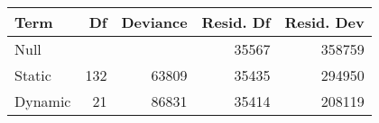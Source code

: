 
\begin{tabular}{lrrrr}
    \toprule
    \textbf{Term}
        & \textbf{Df}
        & \textbf{Deviance}
        & \textbf{Resid. Df}
        & \textbf{Resid. Dev} \\
    \midrule
    Null &  &  & 35567 & 358759 \\
    Static & 132 & 63809 & 35435 & 294950 \\
    Dynamic & 21 & 86831 & 35414 & 208119 \\
    \bottomrule
\end{tabular}
